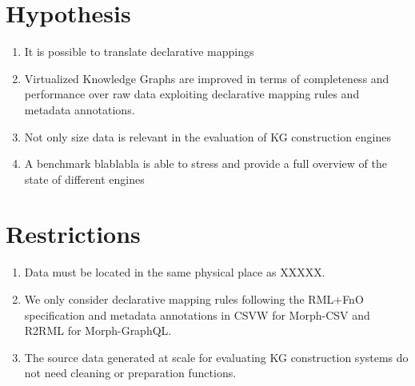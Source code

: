 \section{Hypothesis}

\begin{enumerate}[label=\textbf{H{\arabic*}}]
    \item It is possible to translate declarative mappings
    \item Virtualized Knowledge Graphs are improved in terms of completeness and performance over raw data exploiting declarative mapping rules and metadata annotations.
    \item Not only size data is relevant in the evaluation of KG construction engines
    \item A benchmark blablabla is able to stress and provide a full overview of the state of different engines 
\end{enumerate}

\section{Restrictions}

\begin{enumerate}[label=\textbf{R{\arabic*}}]
    \item Data must be located in the same physical place as XXXXX.
    \item We only consider declarative mapping rules following the RML+FnO~\citep{de2017declarative} specification and metadata annotations in CSVW for Morph-CSV and R2RML for Morph-GraphQL.
    \item The source data generated at scale for evaluating KG construction systems do not need cleaning or preparation functions.
\end{enumerate}

